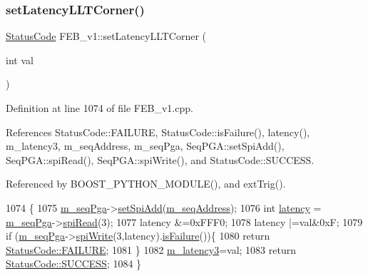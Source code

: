 \subsubsection{\texorpdfstring{set\+Latency\+L\+L\+T\+Corner()}{setLatencyLLTCorner()}}
{\footnotesize\ttfamily \hyperlink{classStatusCode}{Status\+Code} F\+E\+B\+\_\+v1\+::set\+Latency\+L\+L\+T\+Corner (\begin{DoxyParamCaption}\item[{int}]{val }\end{DoxyParamCaption})}



Definition at line 1074 of file F\+E\+B\+\_\+v1.\+cpp.



References Status\+Code\+::\+F\+A\+I\+L\+U\+RE, Status\+Code\+::is\+Failure(), latency(), m\+\_\+latency3, m\+\_\+seq\+Address, m\+\_\+seq\+Pga, Seq\+P\+G\+A\+::set\+Spi\+Add(), Seq\+P\+G\+A\+::spi\+Read(), Seq\+P\+G\+A\+::spi\+Write(), and Status\+Code\+::\+S\+U\+C\+C\+E\+SS.



Referenced by B\+O\+O\+S\+T\+\_\+\+P\+Y\+T\+H\+O\+N\+\_\+\+M\+O\+D\+U\+L\+E(), and ext\+Trig().


\begin{DoxyCode}
1074                                              \{
1075   \hyperlink{classFEB__v1_a6c7804ac86796f233a8393043adf2e77}{m\_seqPga}->\hyperlink{classSeqPGA_ac998ce3a6d9b5f2e88cc8393f8c1df53}{setSpiAdd}(\hyperlink{classFEB__v1_a1c1eb093fd1733b9510fcf8bc5c7ad08}{m\_seqAddress});
1076   \textcolor{keywordtype}{int} \hyperlink{classFEB__v1_a68050d232efd8d6568910b09a2c18f62}{latency} = \hyperlink{classFEB__v1_a6c7804ac86796f233a8393043adf2e77}{m\_seqPga}->\hyperlink{classSeqPGA_ab3d0e5e5d4014bc7a92588a76b8713d4}{spiRead}(3);
1077   latency &=0xFFF0;
1078   latency |=val&0xF;
1079    \textcolor{keywordflow}{if} (\hyperlink{classFEB__v1_a6c7804ac86796f233a8393043adf2e77}{m\_seqPga}->\hyperlink{classSeqPGA_ad4421841ce4ce8b88ad13f63216f0743}{spiWrite}(3,latency).\hyperlink{classStatusCode_a5dd22dc6eb2c52fc4cabc58f6dea2eb7}{isFailure}())\{
1080     \textcolor{keywordflow}{return} \hyperlink{classStatusCode_a6f565cbeadc76d14c72f047e5e85eb4ba3da73d4c469762eb9d3c960368252b26}{StatusCode::FAILURE};
1081   \}
1082    \hyperlink{classFEB__v1_a2f71bdcef05c845177a62610da490bf9}{m\_latency3}=val;
1083   \textcolor{keywordflow}{return} \hyperlink{classStatusCode_a6f565cbeadc76d14c72f047e5e85eb4badd0da38d3ba0d922efd1f4619bc37ad8}{StatusCode::SUCCESS};   
1084 \}
\end{DoxyCode}
\mbox{\label{classFEB__v1_a840532b78d0062646116a076e65cf353}} 
